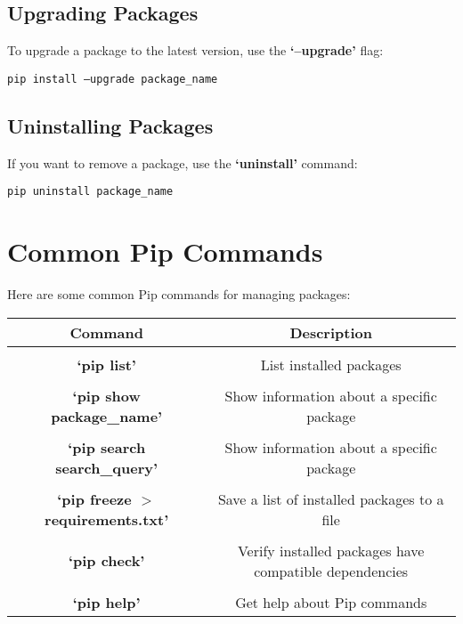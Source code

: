 \documentclass[a4paper, 12pt]{report}
\newcommand{\commandbox}[1]{%
    \begin{tcolorbox}[colback=green!10, colframe=green!50!black, rounded corners]
        #1
    \end{tcolorbox}%
}
\begin{document}
        \subsection{Upgrading Packages}
            To upgrade a package to the latest version, use the \textbf{`--upgrade'} flag:
            \commandbox{\texttt{pip install --upgrade package\_name}}
            
        \subsection{Uninstalling Packages}
            If you want to remove a package, use the \textbf{`uninstall'} command:
            \commandbox{\texttt{pip uninstall package\_name}}
    
    \newpage

    
    \section{Common Pip Commands}
        Here are some common Pip commands for managing packages:

        \begin{tcolorbox}[colback=white, colframe=black, rounded corners]
        \small
        \begin{tabular}{c|c}
        
             \\[2pt] \textbf{Command} & \textbf{Description} \\[15pt]
             \hline
             
             \\[1pt] \textbf{`pip list'} & List installed packages \\[10pt]
             \hline
             
             \\[1pt]\textbf{`pip show package\_name'} & Show information about a specific package \\[10pt]
             \hline

             \\[1pt]\textbf{`pip search search\_query'} & Show information about a specific package \\[10pt]
             \hline

             \\[1pt]\textbf{`pip freeze $>$ requirements.txt'} & Save a list of installed packages to a file \\[10pt]
             \hline

             \\[1pt] \textbf{`pip check'} & Verify installed packages have compatible dependencies \\[10pt]
             \hline
             
             \\[1pt] \textbf{`pip help'} & Get help about Pip commands \\[10pt]
             
        \end{tabular}
        \end{tcolorbox}
\end{document}
